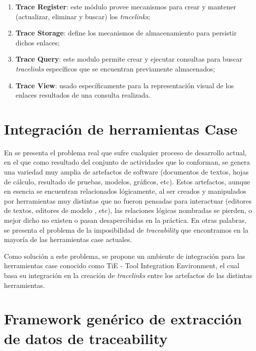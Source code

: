 \documentclass[a4paper,12pt,oneside,spanish]{book}
\begin{document}
\begin{enumerate}
\item \textbf{Trace Register}: este módulo provee mecanismos para crear y mantener (actualizar, eliminar y buscar) los \textit{tracelinks};
\item \textbf{Trace Storage}: define los mecanismos de almacenamiento para persistir dichos enlaces;
\item \textbf{Trace Query}: este modulo permite crear y ejecutar consultas para buscar \textit{tracelinks} específicos que se encuentran previamente almacenados;
\item \textbf{Trace View}: usado específicamente para la representación visual de los enlaces resultados de una consulta realizada.
\end{enumerate}


\section{Integración de herramientas Case}

En \cite{KlarRoseSchurr} se presenta el problema real que sufre cualquier proceso de desarrollo actual, en el que como resultado del conjunto de actividades que lo conforman, se genera una variedad muy amplia de artefactos de software (documentos de textos, hojas de cálculo, resultado de pruebas, modelos, gráficos, etc). Estos artefactos, aunque en esencia se encuentran relacionados lógicamente, al ser creados y manipulados por herramientas muy distintas que no fueron pensadas para interactuar (editores de textos, editores de modelo , etc), las relaciones lógicas nombradas se pierden, o mejor dicho no existen o pasan desapercibidas en la práctica. En otras palabras, se presenta el problema de la imposibilidad de \textit{traceability} que encontramos en la mayoría de las herramientas \gls{case} actuales.

Como solución a este problema, se propone un ambiente de integración para las herramientas \gls{case} conocido como \textsf{TiE} - Tool Integration Environment, el cual basa su integración en la creación de \textit{tracelinks} entre los artefactos de las distintas herramientas.

\section{Framework genérico de extracción de datos de traceability}
\label{sec:Trace-DSL}
\end{document}
